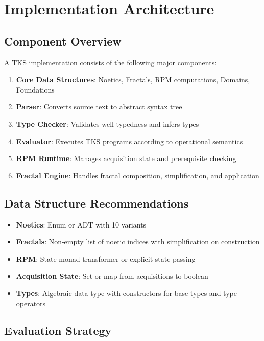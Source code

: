 \documentclass[11pt,twoside,openright]{book}
\theoremstyle{definition}
\theoremstyle{plain}
\theoremstyle{remark}
\begin{document}
\chapter{Implementation Architecture}
\label{ch:implementation}

\section{Component Overview}

A TKS implementation consists of the following major components:

\begin{enumerate}
\item \textbf{Core Data Structures}: Noetics, Fractals, RPM computations, Domains, Foundations
\item \textbf{Parser}: Converts source text to abstract syntax tree
\item \textbf{Type Checker}: Validates well-typedness and infers types
\item \textbf{Evaluator}: Executes TKS programs according to operational semantics
\item \textbf{RPM Runtime}: Manages acquisition state and prerequisite checking
\item \textbf{Fractal Engine}: Handles fractal composition, simplification, and application
\end{enumerate}

\section{Data Structure Recommendations}

\begin{itemize}
\item \textbf{Noetics}: Enum or ADT with 10 variants
\item \textbf{Fractals}: Non-empty list of noetic indices with simplification on construction
\item \textbf{RPM}: State monad transformer or explicit state-passing
\item \textbf{Acquisition State}: Set or map from acquisitions to boolean
\item \textbf{Types}: Algebraic data type with constructors for base types and type operators
\end{itemize}

\section{Evaluation Strategy}
\end{document}
